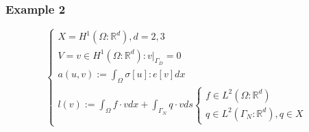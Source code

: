 \documentclass[a4paper,12pt]{article}
\newcommand{\R}{\mathbb{R}}
\begin{document}
\subsubsection{Example 2}
\begin{equation*}
\begin{cases}
X=H^1(\Omega : \R^d), d=2,3\\
V={v \in H^1(\Omega: \R^d): v|_{\Gamma_D}=0}\\
a(u,v) := \int_\Omega \sigma[u] : e[v] dx\\
l(v) := \int_\Omega f\cdot v dx + \int_{\Gamma_N} q\cdot v ds \begin{cases}
f \in L^2(\Omega:\R^d)\\
q \in L^2(\Gamma_N : \R^d), q \in X
\end{cases}
\end{cases}
\end{equation*}
\end{document}
